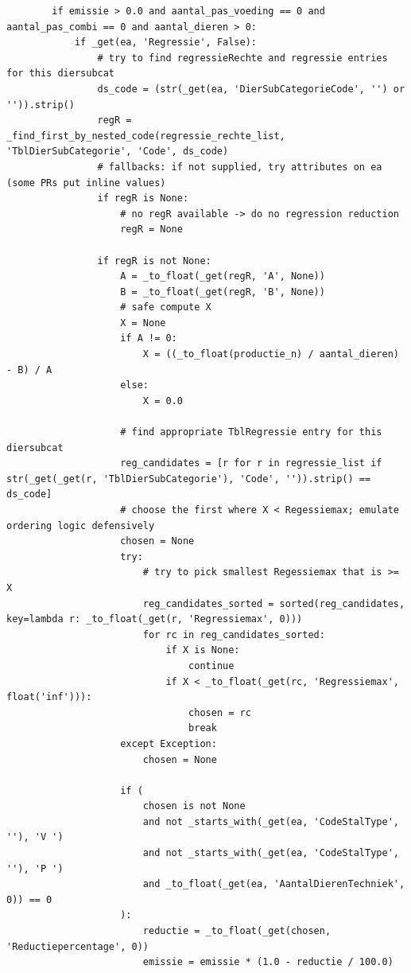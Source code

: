 \begin{verbatim}
        if emissie > 0.0 and aantal_pas_voeding == 0 and aantal_pas_combi == 0 and aantal_dieren > 0:
            if _get(ea, 'Regressie', False):
                # try to find regressieRechte and regressie entries for this diersubcat
                ds_code = (str(_get(ea, 'DierSubCategorieCode', '') or '')).strip()
                regR = _find_first_by_nested_code(regressie_rechte_list, 'TblDierSubCategorie', 'Code', ds_code)
                # fallbacks: if not supplied, try attributes on ea (some PRs put inline values)
                if regR is None:
                    # no regR available -> do no regression reduction
                    regR = None

                if regR is not None:
                    A = _to_float(_get(regR, 'A', None))
                    B = _to_float(_get(regR, 'B', None))
                    # safe compute X
                    X = None
                    if A != 0:
                        X = ((_to_float(productie_n) / aantal_dieren) - B) / A
                    else:
                        X = 0.0

                    # find appropriate TblRegressie entry for this diersubcat
                    reg_candidates = [r for r in regressie_list if str(_get(_get(r, 'TblDierSubCategorie'), 'Code', '')).strip() == ds_code]
                    # choose the first where X < Regessiemax; emulate ordering logic defensively
                    chosen = None
                    try:
                        # try to pick smallest Regessiemax that is >= X
                        reg_candidates_sorted = sorted(reg_candidates, key=lambda r: _to_float(_get(r, 'Regressiemax', 0)))
                        for rc in reg_candidates_sorted:
                            if X is None:
                                continue
                            if X < _to_float(_get(rc, 'Regressiemax', float('inf'))):
                                chosen = rc
                                break
                    except Exception:
                        chosen = None

                    if (
                        chosen is not None
                        and not _starts_with(_get(ea, 'CodeStalType', ''), 'V ')
                        and not _starts_with(_get(ea, 'CodeStalType', ''), 'P ')
                        and _to_float(_get(ea, 'AantalDierenTechniek', 0)) == 0
                    ):
                        reductie = _to_float(_get(chosen, 'Reductiepercentage', 0))
                        emissie = emissie * (1.0 - reductie / 100.0)


\end{verbatim}
